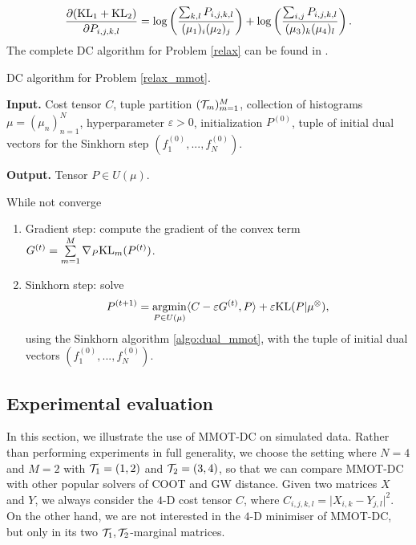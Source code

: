 \begin{equation} \label{optim_condition}
  \frac{\partial (\text{KL}_1 + \text{KL}_2)}{\partial P_{i,j,k,l}} =
  \log \left( \frac{\sum_{k,l} P_{i,j,k,l}}{(\mu_1)_i (\mu_2)_j} \right) +
  \log \left( \frac{\sum_{i,j} P_{i,j,k,l}}{(\mu_3)_k (\mu_4)_l} \right).
\end{equation}
The complete DC algorithm for Problem \eqref{relax} can be found in .
\begin{algorithm}[t]
  \caption{DC algorithm for Problem \eqref{relax_mmot}.}
  \textbf{Input.} Cost tensor $C$, tuple partition $(\mathcal T_m)_{m=1}^M$, collection of histograms $\mu = (\mu_n)_{n=1}^N$,
  hyperparameter $\varepsilon > 0$, initialization $P^{(0)}$, tuple of initial dual vectors for the
  Sinkhorn step $(f_1^{(0)},...,f_N^{(0)})$.

  \textbf{Output.} Tensor $P \in U(\mu)$.

  While not converge
  \begin{enumerate}
    \item Gradient step: compute the gradient of the convex term $G^{(t)} = \sum\limits_{m=1}^M \nabla_P \text{KL}_m(P^{(t)})$.
    \item Sinkhorn step: solve
    \begin{equation}
      P^{(t+1)} = \operatorname*{argmin}_{P \in U(\mu)} \langle C - \varepsilon G^{(t)}, P \rangle + \varepsilon \text{KL}(P | \mu^{\otimes}),
    \end{equation}
    using the Sinkhorn algorithm \ref{algo:dual_mmot}, with the tuple of initial dual vectors $(f_1^{(0)},...,f_N^{(0)})$.
  \end{enumerate}
  \label{algo:dc_MMOT}
\end{algorithm}

\subsection{Experimental evaluation} \label{sec:exp}
In this section, we illustrate the use of MMOT-DC on simulated data. Rather than performing experiments in full generality,
we choose the setting where $N = 4$ and $M=2$ with $\mathcal T_1 = (1,2)$ and $\mathcal T_2 = (3,4)$,
so that we can compare MMOT-DC with other popular solvers of COOT and GW distance. Given two matrices $X$ and $Y$, we always consider the $4$-D cost tensor $C$,
where $C_{i,j,k,l} = \vert X_{i,k} - Y_{j,l} \vert^2$. On the other hand, we are not interested in the $4$-D minimiser of MMOT-DC,
but only in its two $\mathcal T_1, \mathcal T_2$-marginal matrices.

